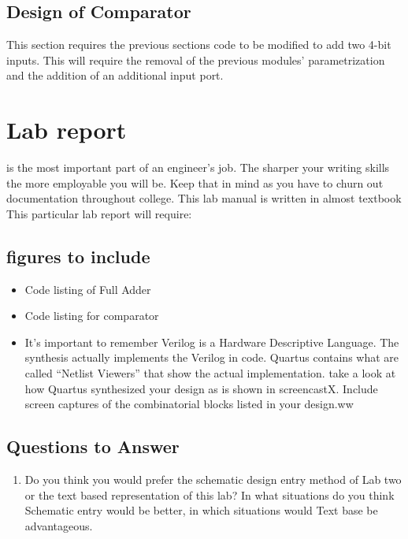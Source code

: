 \documentclass[12pt,journal]{IEEEtran}
\begin{document}
  \subsection{Design of Comparator}
    This section requires the previous sections code to be modified to add two 4-bit inputs. This will require the removal of the previous modules' parametrization and the addition of an additional input port. 

  \section{Lab report}
     is the most important part of an engineer's job. The sharper your writing skills the more employable you will be. Keep that in mind as you have to churn out documentation throughout college. This lab manual is written in almost textbook This particular lab report will require:
    \subsection{figures to include}
    \begin{itemize}
      \item Code listing of Full Adder
      \item Code listing for comparator
      \item It's important to remember Verilog is a Hardware Descriptive Language. The synthesis actually implements the Verilog in code. Quartus contains what are called ``Netlist Viewers'' that show the actual implementation. take a look at how Quartus synthesized your design as is shown in screencastX. Include screen captures of the combinatorial blocks listed in your design.ww
    \end{itemize}

    \subsection{Questions to Answer}
      \begin{enumerate}
        \item Do you think you would prefer the schematic design entry method of Lab two or the text based representation of this lab? In what situations do you think Schematic entry would be better, in which situations would Text base be advantageous.
      \end{enumerate}
\end{document}

